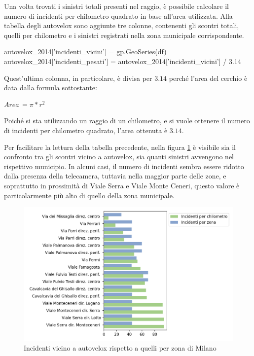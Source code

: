 \documentclass[a4paper,12pt]{report}
\begin{document}

Una volta trovati i sinistri totali presenti nel raggio, 
è possibile calcolare il numero di incidenti per chilometro quadrato 
in base all'area utilizzata. 
Alla tabella degli autovelox sono aggiunte tre colonne, contenenti gli scontri totali, 
quelli per chilometro e i sinistri registrati nella zona municipale corrispondente. 

\begin{code}
autovelox_2014['incidenti_vicini'] = gp.GeoSeries(df)
autovelox_2014['incidenti_pesati'] = autovelox_2014['incidenti_vicini'] / 3.14
\end{code}

Quest'ultima colonna, in particolare, è divisa per $3.14$ perché l'area del cerchio 
è data dalla formula sottostante: 

\begin{center}
    $Area\, = \pi * r^2$
\end{center}

Poiché si sta utilizzando un raggio di un chilometro, e si vuole ottenere il 
numero di incidenti per chilometro quadrato, l'area ottenuta è $3.14$. 

Per facilitare la lettura della tabella precedente, nella figura \ref{fig:confronto-autovelox} 
è visibile sia il confronto tra gli scontri vicino a autovelox, 
sia quanti sinistri avvengono nel rispettivo municipio. 
In alcuni casi, il numero di incidenti sembra essere ridotto dalla presenza 
della telecamera,  
tuttavia nella maggior parte delle zone, e soprattutto in prossimità di Viale Serra e 
Viale Monte Ceneri, questo valore è particolarmente più alto di 
quello della zona municipale. 

\begin{figure}
    \includegraphics[width=\linewidth]{../src/autovelox/conclusioni_autovelox.png}
    \caption{Incidenti vicino a autovelox rispetto a quelli per zona di Milano}
    \label{fig:confronto-autovelox}
\end{figure}
\end{document}
